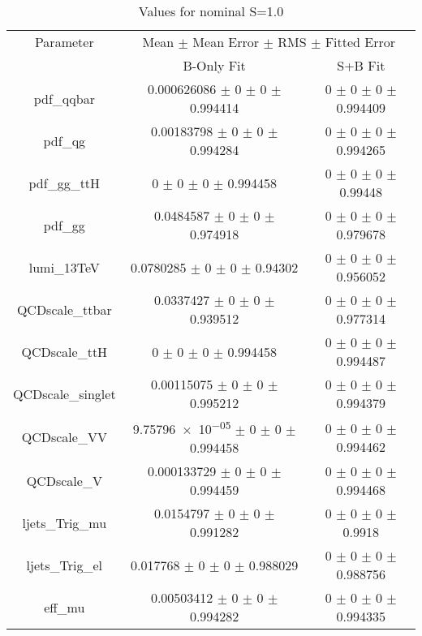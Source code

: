 \begin{table}
\centering
\caption{Values for nominal S=1.0}
\begin{tabular}{ccc}
\toprule
Parameter & \multicolumn{2}{c}{Mean $\pm$ Mean Error $\pm$ RMS $\pm$ Fitted Error}\\
 & B-Only Fit & S+B Fit\\
\midrule
pdf\_qqbar & \num{0.000626086} $\pm$ \num{0} $\pm$ \num{0} $\pm$ \num{0.994414} & \num{0} $\pm$ \num{0} $\pm$ \num{0} $\pm$ \num{0.994409}\\
pdf\_qg & \num{0.00183798} $\pm$ \num{0} $\pm$ \num{0} $\pm$ \num{0.994284} & \num{0} $\pm$ \num{0} $\pm$ \num{0} $\pm$ \num{0.994265}\\
pdf\_gg\_ttH & \num{0} $\pm$ \num{0} $\pm$ \num{0} $\pm$ \num{0.994458} & \num{0} $\pm$ \num{0} $\pm$ \num{0} $\pm$ \num{0.99448}\\
pdf\_gg & \num{0.0484587} $\pm$ \num{0} $\pm$ \num{0} $\pm$ \num{0.974918} & \num{0} $\pm$ \num{0} $\pm$ \num{0} $\pm$ \num{0.979678}\\
lumi\_13TeV & \num{0.0780285} $\pm$ \num{0} $\pm$ \num{0} $\pm$ \num{0.94302} & \num{0} $\pm$ \num{0} $\pm$ \num{0} $\pm$ \num{0.956052}\\
QCDscale\_ttbar & \num{0.0337427} $\pm$ \num{0} $\pm$ \num{0} $\pm$ \num{0.939512} & \num{0} $\pm$ \num{0} $\pm$ \num{0} $\pm$ \num{0.977314}\\
QCDscale\_ttH & \num{0} $\pm$ \num{0} $\pm$ \num{0} $\pm$ \num{0.994458} & \num{0} $\pm$ \num{0} $\pm$ \num{0} $\pm$ \num{0.994487}\\
QCDscale\_singlet & \num{0.00115075} $\pm$ \num{0} $\pm$ \num{0} $\pm$ \num{0.995212} & \num{0} $\pm$ \num{0} $\pm$ \num{0} $\pm$ \num{0.994379}\\
QCDscale\_VV & \num{9.75796e-05} $\pm$ \num{0} $\pm$ \num{0} $\pm$ \num{0.994458} & \num{0} $\pm$ \num{0} $\pm$ \num{0} $\pm$ \num{0.994462}\\
QCDscale\_V & \num{0.000133729} $\pm$ \num{0} $\pm$ \num{0} $\pm$ \num{0.994459} & \num{0} $\pm$ \num{0} $\pm$ \num{0} $\pm$ \num{0.994468}\\
ljets\_Trig\_mu & \num{0.0154797} $\pm$ \num{0} $\pm$ \num{0} $\pm$ \num{0.991282} & \num{0} $\pm$ \num{0} $\pm$ \num{0} $\pm$ \num{0.9918}\\
ljets\_Trig\_el & \num{0.017768} $\pm$ \num{0} $\pm$ \num{0} $\pm$ \num{0.988029} & \num{0} $\pm$ \num{0} $\pm$ \num{0} $\pm$ \num{0.988756}\\
eff\_mu & \num{0.00503412} $\pm$ \num{0} $\pm$ \num{0} $\pm$ \num{0.994282} & \num{0} $\pm$ \num{0} $\pm$ \num{0} $\pm$ \num{0.994335}\\

\end{tabular}
\end{table}
